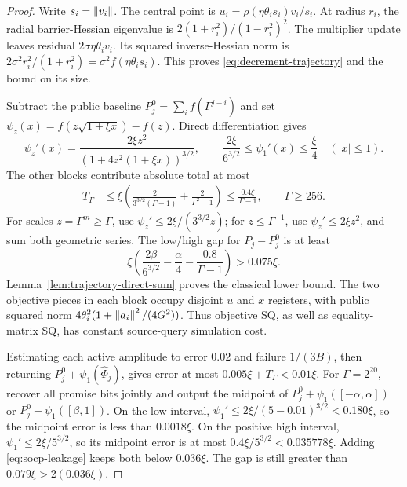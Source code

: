 \begin{proof}
Write $s_i=\left\lVert v_i\right\rVert$.  The central point is
$u_i=\rho(\eta\theta_i s_i)v_i/s_i$.  At radius $r_i$, the radial
barrier-Hessian eigenvalue is $2(1+r_i^2)/(1-r_i^2)^2$.
The multiplier update leaves residual $2\sigma\eta\theta_i v_i$.
Its squared inverse-Hessian norm is
$2\sigma^2r_i^2/(1+r_i^2)=\sigma^2 f(\eta\theta_i s_i)$.
This proves \eqref{eq:decrement-trajectory} and the bound on its size.

Subtract the public baseline $P_j^0=\sum_i f(\Gamma^{j-i})$ and set
$\psi_z(x)=f(z\sqrt{1+\xi x})-f(z)$.  Direct differentiation gives
\begin{equation}\label{eq:decrement-sensitivity}
 \psi_z'(x)=\frac{2\xi z^2}{(1+4z^2(1+\xi x))^{3/2}},\qquad
 \frac{2\xi}{6^{3/2}}\leq\psi_1'(x)\leq\frac\xi4
 \quad (|x|\leq1).
\end{equation}
The other blocks contribute absolute total at most
\begin{align}
 T_\Gamma
 &\leq\xi\left(\frac{2}{3^{3/2}(\Gamma-1)}
                 +\frac{2}{\Gamma^2-1}\right)
 \leq\frac{0.4\xi}{\Gamma-1},\qquad\Gamma\geq256.
 \label{eq:socp-leakage}
\end{align}
For scales $z=\Gamma^m\geq\Gamma$, use
$\psi_z'\leq2\xi/(3^{3/2}z)$; for $z\leq\Gamma^{-1}$, use
$\psi_z'\leq2\xi z^2$, and sum both geometric series.
The low/high gap for $P_j-P_j^0$ is at least
\[
 \xi\left(\frac{2\beta}{6^{3/2}}-\frac\alpha4
                  -\frac{0.8}{\Gamma-1}\right)>0.075\xi.
\]
Lemma~\ref{lem:trajectory-direct-sum} proves the classical lower bound.
The two objective pieces in each block occupy disjoint $u$ and $x$
registers, with public squared norm
$4\theta_i^2(1+\left\lVert a_i\right\rVert^2/(4G^2))$.  Thus objective SQ, as well as
equality-matrix SQ, has constant source-query simulation cost.

Estimating each active amplitude to error $0.02$ and failure $1/(3B)$,
then returning $P_j^0+\psi_1(\widehat\Phi_j)$, gives error at most
$0.005\xi+T_\Gamma<0.01\xi$.  For $\Gamma=2^{20}$, recover all
promise bits jointly and output the midpoint of
$P_j^0+\psi_1([-\alpha,\alpha])$ or
$P_j^0+\psi_1([\beta,1])$.  On the low interval,
$\psi_1'\leq2\xi/(5-0.01)^{3/2}<0.180\xi$, so the midpoint error is
less than $0.0018\xi$.  On the positive high interval,
$\psi_1'\leq2\xi/5^{3/2}$, so its midpoint error is at most
$0.4\xi/5^{3/2}<0.035778\xi$.
Adding \eqref{eq:socp-leakage} keeps both below $0.036\xi$.
The gap is still greater than $0.079\xi>2(0.036\xi)$.
\end{proof}

